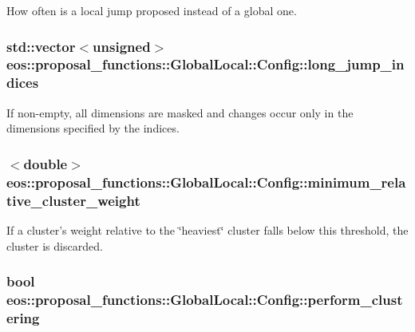 How often is a local jump proposed instead of a global one. \hypertarget{structeos_1_1proposal__functions_1_1GlobalLocal_1_1Config_a81dad6982f265eccfc5f1d030f0ff5a7}{
\subsubsection[{long\_\-jump\_\-indices}]{\setlength{\rightskip}{0pt plus 5cm}std::vector$<$unsigned$>$ {\bf eos::proposal\_\-functions::GlobalLocal::Config::long\_\-jump\_\-indices}}}
\label{structeos_1_1proposal__functions_1_1GlobalLocal_1_1Config_a81dad6982f265eccfc5f1d030f0ff5a7}
If non-\/empty, all dimensions are masked and changes occur only in the dimensions specified by the indices. \hypertarget{structeos_1_1proposal__functions_1_1GlobalLocal_1_1Config_ab46531993b150f25845f03a98046f768}{
\subsubsection[{minimum\_\-relative\_\-cluster\_\-weight}]{$<$double$>$ {\bf eos::proposal\_\-functions::GlobalLocal::Config::minimum\_\-relative\_\-cluster\_\-weight}}}
\label{structeos_1_1proposal__functions_1_1GlobalLocal_1_1Config_ab46531993b150f25845f03a98046f768}
If a cluster's weight relative to the \char`\"{}heaviest\char`\"{} cluster falls below this threshold, the cluster is discarded. \hypertarget{structeos_1_1proposal__functions_1_1GlobalLocal_1_1Config_a42bdc4d80a759f9daab15d01b0edf4b6}{
\subsubsection[{perform\_\-clustering}]{\setlength{\rightskip}{0pt plus 5cm}bool {\bf eos::proposal\_\-functions::GlobalLocal::Config::perform\_\-clustering}}}
